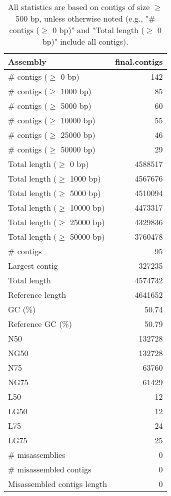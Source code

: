 \documentclass[12pt,a4paper]{article}
\begin{document}
\begin{table}[ht]
\begin{center}
\caption{All statistics are based on contigs of size $\geq$ 500 bp, unless otherwise noted (e.g., "\# contigs ($\geq$ 0 bp)" and "Total length ($\geq$ 0 bp)" include all contigs).}
\begin{tabular}{|l*{1}{|r}|}
\hline
Assembly & final.contigs \\ \hline
\# contigs ($\geq$ 0 bp) & 142 \\ \hline
\# contigs ($\geq$ 1000 bp) & 85 \\ \hline
\# contigs ($\geq$ 5000 bp) & 60 \\ \hline
\# contigs ($\geq$ 10000 bp) & 55 \\ \hline
\# contigs ($\geq$ 25000 bp) & 46 \\ \hline
\# contigs ($\geq$ 50000 bp) & 29 \\ \hline
Total length ($\geq$ 0 bp) & 4588517 \\ \hline
Total length ($\geq$ 1000 bp) & 4567676 \\ \hline
Total length ($\geq$ 5000 bp) & 4510094 \\ \hline
Total length ($\geq$ 10000 bp) & 4473317 \\ \hline
Total length ($\geq$ 25000 bp) & 4329836 \\ \hline
Total length ($\geq$ 50000 bp) & 3760478 \\ \hline
\# contigs & 95 \\ \hline
Largest contig & 327235 \\ \hline
Total length & 4574732 \\ \hline
Reference length & 4641652 \\ \hline
GC (\%) & 50.74 \\ \hline
Reference GC (\%) & 50.79 \\ \hline
N50 & 132728 \\ \hline
NG50 & 132728 \\ \hline
N75 & 63760 \\ \hline
NG75 & 61429 \\ \hline
L50 & 12 \\ \hline
LG50 & 12 \\ \hline
L75 & 24 \\ \hline
LG75 & 25 \\ \hline
\# misassemblies & 0 \\ \hline
\# misassembled contigs & 0 \\ \hline
Misassembled contigs length & 0 \\ \hline

\end{tabular}
\end{center}
\end{table}
\end{document}
